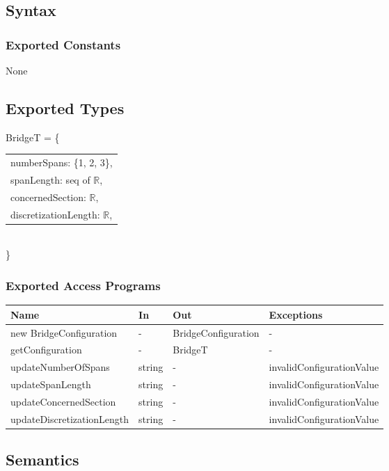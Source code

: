 \documentclass[12pt, titlepage]{article}
\begin{document}
\subsection{Syntax}

\subsubsection{Exported Constants}
None
\subsection{Exported Types}
BridgeT = \{\\
    \begin{tabular}{l}
	numberSpans: \{1, 2, 3\},\\
	spanLength: seq of $\mathbb{R}$,\\
	concernedSection: $\mathbb{R}$,\\
    discretizationLength: $\mathbb{R}$,\\
    \end{tabular}
\\\}
\subsubsection{Exported Access Programs}
\begin{center}
\begin{tabular}{p{5cm} p{2cm} p{4cm} p{4cm}}
\hline
\textbf{Name} & \textbf{In} & \textbf{Out} & \textbf{Exceptions} \\
\hline
new BridgeConfiguration & - & BridgeConfiguration & - \\
\hline
getConfiguration & - & BridgeT & -\\
\hline
updateNumberOfSpans & string & - & invalidConfigurationValue \\
\hline

\hline
updateSpanLength & string & - & invalidConfigurationValue \\
\hline

\hline
updateConcernedSection & string & - & invalidConfigurationValue \\
\hline

\hline
updateDiscretizationLength & string & - & invalidConfigurationValue \\
\hline

\end{tabular}
\end{center}

\subsection{Semantics}
\end{document}
